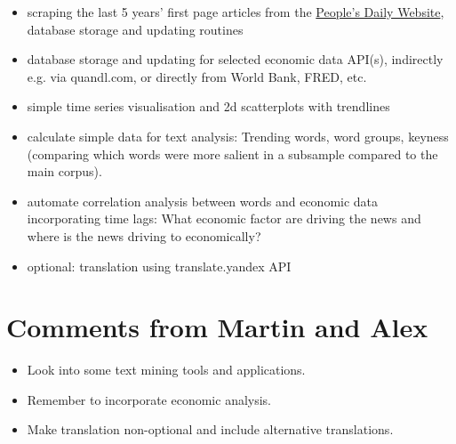 \documentclass[11pt]{scrarticle} %
\begin{document}
\begin{itemize}
\item scraping the last 5 years' first page articles from the \href{http://paper.people.com.cn/}{People's Daily Website}, database storage and updating routines
\item database storage and updating for selected economic data API(s), indirectly e.g. via quandl.com, or directly from World Bank, FRED, etc.
\item simple time series visualisation and 2d scatterplots with trendlines
\item calculate simple data for text analysis: Trending words, word groups, keyness (comparing which words were more salient in a subsample compared to the main corpus).
\item automate correlation analysis between words and economic data incorporating time lags: What economic factor are driving the news and where is the news driving to economically?
\item optional: translation using translate.yandex API
\end{itemize}

\section{Comments from Martin and Alex}

\begin{itemize}
\item Look into some text mining tools and applications.
\item Remember to incorporate economic analysis.
\item Make translation non-optional and include alternative translations.
\end{itemize}
\end{document}
